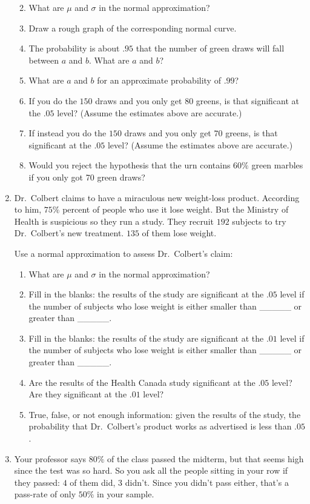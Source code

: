 \documentclass[justified]{tufte-book}
\providecommand{\tightlist}{%
  \setlength{\itemsep}{0pt}\setlength{\parskip}{0pt}}
\theoremstyle{definition}
\theoremstyle{definition}
\theoremstyle{definition}
\theoremstyle{definition}
\theoremstyle{remark}
\begin{document}
\begin{enumerate}
  \begin{enumerate}
  \def\labelenumii{\alph{enumii}.}
  \tightlist
  \item
    What are \(\mu\) and \(\sigma\) in the normal approximation?
  \item
    Draw a rough graph of the corresponding normal curve.
  \item
    The probability is about \(.95\) that the number of green draws will fall between \(a\) and \(b\). What are \(a\) and \(b\)?
  \item
    What are \(a\) and \(b\) for an approximate probability of \(.99\)?
  \item
    If you do the \(150\) draws and you only get \(80\) greens, is that significant at the \(.05\) level? (Assume the estimates above are accurate.)
  \item
    If instead you do the \(150\) draws and you only get \(70\) greens, is that significant at the \(.05\) level? (Assume the estimates above are accurate.)
  \item
    Would you reject the hypothesis that the urn contains \(60\%\) green marbles if you only got 70 green draws?
  \end{enumerate}
\item
  Dr.~Colbert claims to have a miraculous new weight-loss product. According to him, \(75\%\) percent of people who use it lose weight. But the Ministry of Health is suspicious so they run a study. They recruit \(192\) subjects to try Dr.~Colbert's new treatment. \(135\) of them lose weight.

  Use a normal approximation to assess Dr.~Colbert's claim:

  \begin{enumerate}
  \def\labelenumii{\alph{enumii}.}
  \tightlist
  \item
    What are \(\mu\) and \(\sigma\) in the normal approximation?
  \item
    Fill in the blanks: the results of the study are significant at the \(.05\) level if the number of subjects who lose weight is either smaller than \_\_\_\_\_ or greater than \_\_\_\_\_.
  \item
    Fill in the blanks: the results of the study are significant at the \(.01\) level if the number of subjects who lose weight is either smaller than \_\_\_\_\_ or greater than \_\_\_\_\_.
  \item
    Are the results of the Health Canada study significant at the \(.05\) level? Are they significant at the \(.01\) level?
  \item
    True, false, or not enough information: given the results of the study, the probability that Dr.~Colbert's product works as advertised is less than \(.05\).
  \end{enumerate}
\item
  Your professor says \(80\%\) of the class passed the midterm, but that seems high since the test was so hard. So you ask all the people sitting in your row if they passed: \(4\) of them did, \(3\) didn't. Since you didn't pass either, that's a pass-rate of only \(50\%\) in your sample.


\end{enumerate}
\end{document}
